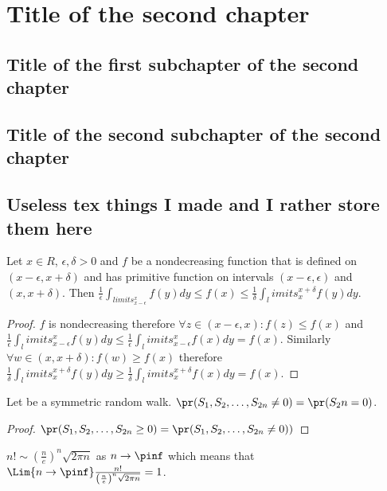 \chapter{Title of the second chapter}

\section{Title of the first subchapter of the second chapter}

\section{Title of the second subchapter of the second chapter}

\section{Useless tex things I made and I rather store them here}
\begin{lemma}\label{thm-nondecreasing}
  Let $x \in R$, $\epsilon, \delta>0$ and $f$ be a nondecreasing function that is defined on $(x-\epsilon, x+\delta)$ and has primitive function on intervals $(x-\epsilon, \epsilon)$ and $(x,x+\delta).$ Then $\frac{1}{\epsilon}\int_{limits_{x-\epsilon}^x} f(y) dy\leq f(x)\leq \frac{1}{\delta}\int_limits_{x}^{x+\delta} f(y) dy$.
\end{lemma}
\begin{proof}
  $f$ is nondecreasing therefore $\forall z \in (x-\epsilon, x): f(z)\leq f(x)$ and $\frac{1}{\epsilon}\int_limits_{x-\epsilon}^x f(y) dy\leq \frac{1}{\epsilon}\int_limits_{x-\epsilon}^x f(x) dy =f(x)$. Similarly $\forall w \in (x, x+\delta): f(w)\geq f(x)$ therefore $\frac{1}{\delta}\int_limits_{x}^{x+\delta} f(y) dy \geq \frac{1}{\delta}\int_limits_{x}^{x+\delta} f(x) dy=f(x).$
\end{proof}
\begin{thm}
  Let \rw be a symmetric random walk. $\pr(S_1, S_2, \ldots , S_{2n}\neq 0)=\pr(S_2n=0)$.
\end{thm}
\begin{proof}
  $\pr(S_1, S_2, \ldots , S_{2n}\geq 0)=\pr(S_1, S_2, \ldots , S_{2n}\neq 0))$
\end{proof}
\begin{lemma}
  $n!\sim \left(\frac{n}{e}\right)^n\sqrt{2\pi n}$ as $n \to \pinf$ which means that
  $\Lim{n \to \pinf} \frac{n!}{\left(\frac{n}{e}\right)^n\sqrt{2\pi n}}= 1$.
\end{lemma}
